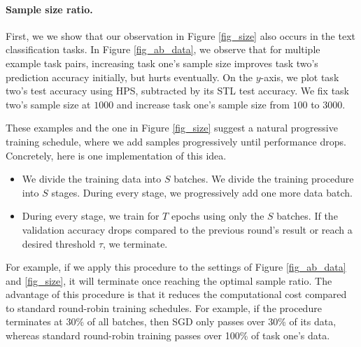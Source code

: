 \paragraph{Sample size ratio.}
First, we we show that our observation in Figure \ref{fig_size} also occurs in the text classification tasks.
In Figure \ref{fig_ab_data}, we observe that for multiple example task pairs, increasing task one's sample size improves task two's prediction accuracy initially, but hurts eventually.
On the $y$-axis, we plot task two's test accuracy using HPS, subtracted by its STL test accuracy.
We fix task two's sample size at $1000$ and increase task one's sample size from $100$ to $3000$.

These examples and the one in Figure \ref{fig_size} suggest a natural progressive training schedule, where we add samples progressively until performance drops.
Concretely, here is one implementation of this idea.
\begin{itemize}
	\item We divide the training data into $S$ batches.
	We divide the training procedure into $S$ stages. During every stage, we progressively add one more data batch.
	\item During every stage, we train for $T$ epochs using only the $S$ batches. If the validation accuracy drops compared to the previous round's result or reach a desired threshold $\tau$, we terminate.
\end{itemize}
For example, if we apply this procedure to the settings of Figure \ref{fig_ab_data} and \ref{fig_size}, it will terminate once reaching the optimal sample ratio.
The advantage of this procedure is that it reduces the computational cost compared to standard round-robin training schedules.
For example, if the procedure terminates at 30\% of all batches, then SGD only passes over 30\% of its data, whereas standard round-robin training passes over 100\% of task one's data.


